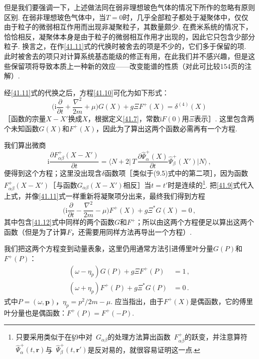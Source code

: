 但是我们要强调一下，上述做法同在弱非理想玻色气体的情况下所作的忽略有原则区别. 在弱非理想玻色气体中，当$T=0$时，几乎全部粒子都处于凝聚体中，仅仅由于粒子的微弱相互作用而出现非凝聚粒子，其数量颇少. 在费米系统的情况下，恰恰相反，凝聚体本身是由于粒子的微弱相互作用才出现的，因此它只包含少部分粒子. 换言之，在作\eqref{41.11}式的代换时被舍去的项是不少的，它们多于保留的项. 此时被舍去的项只对计算系统基态能级的修正有用，在此我们并不感兴趣，但是这些保留项将导致本质上一种新的效应——改变能谱的性质（对此可比较154页的注解）.

经\eqref{41.11}式的代换之后，方程\eqref{41.10}可化为如下形式：
\begin{equation}
\Biggl(\mathrm i\frac{\partial}{\partial t}+\frac{\nabla^2}{2m}+\mu\Biggr)G(X) + g\Xi F^{+}(X) = \delta^{(4)}(X)
\label{41.12}
\end{equation}
［函数的宗量$X-X'$换成$X$，根据定义\eqref{41.7}，常数$\mathrm iF(0)$用$\Xi$表示］. 这里包含两个未知函数$G(X)$和$F^{+}(X)$，因此为了算出这两个函数必需再有一个方程.

我们算出微商
\begin{equation*}
\mathrm i\frac{\partial F^{+}_{\alpha\beta}(X-X')}{\partial t}
= \Biggl\langle N+2\Biggl|\,T\,\frac{\partial\hat\Psi^{+}_\alpha(X)}{\partial t}\hat\Psi^{+}_\beta(X')\Biggr|N\Biggr\rangle\,,
\end{equation*}
便得到这个方程；这里没出现含$\delta$函数项［类似于(9.5)式中的第二项］，因为函数$F^{+}_{\alpha\beta}(X-X')$［与函数$G_{\alpha\beta}(X-X')$相反］当$t=t'$时是连续的\footnote{只要采用类似于在§9中对~$G_{\alpha\beta}$的处理方法算出函数~$F^{+}_{\alpha\beta}$的跃变，并注意算符~$\hat\Psi^{+}_\alpha(t,\bm r)$与~$\hat\Psi^{+}_\beta(t,\bm r')$是反对易的，就很容易证明这一点.}. 把\eqref{41.9}式代入上式，并像\eqref{41.11}式一样重新将凝聚项分出来，最终我们得到方程
\begin{equation}
\Biggl(\mathrm i\frac{\partial}{\partial t}-\frac{\nabla^2}{2m}-\mu\Biggr)F^{+}(X) + g\Xi^{*}G(X) = 0\,,
\label{41.13}
\end{equation}
其中包含\eqref{41.12}式中同样的两个函数$G$和$F^{+}$；所以由这两个方程便足以算出这两个函数（但是为了计算$F$，还需要用同样方法再导出一个方程）.

我们把这两个方程变到动量表象，这里仍用通常方法引进傅里叶分量$G(P)$和$F^{+}(P)$：
\begin{equation}
\begin{aligned}
(\omega-\eta_p)G(P) + g\Xi F^{+}(P) &= 1\,,\\
(\omega+\eta_p)F^{+}(P) + g\Xi^{*}G(P) &= 0\,.
\end{aligned}
\label{41.14}
\end{equation}
式中$P=(\omega,\bm p)$，$\eta_p=p^2/2m-\mu$. 应当指出，由于$F^{+}(X)$是偶函数，它的傅里叶分量也是偶函数：$F^{+}(P)=F^{+}(-P)$.

